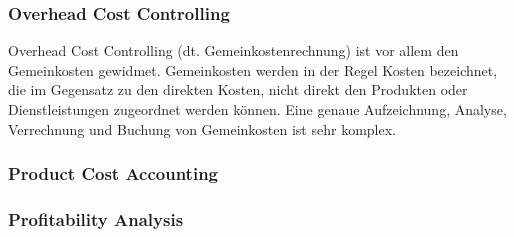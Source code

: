 \subsubsection{Overhead Cost Controlling}
Overhead Cost Controlling (dt. Gemeinkostenrechnung) ist vor allem den Gemeinkosten gewidmet. Gemeinkosten werden in der Regel Kosten bezeichnet, die im Gegensatz zu den direkten Kosten, nicht direkt den Produkten oder Dienstleistungen zugeordnet werden können. Eine genaue Aufzeichnung, Analyse, Verrechnung und Buchung von Gemeinkosten ist sehr komplex. 

\subsubsection{Product Cost Accounting}

\subsubsection{Profitability Analysis} %



























